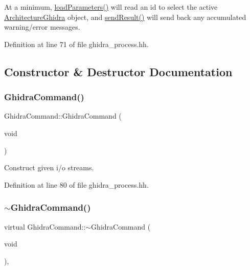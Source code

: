 At a minimum, \mbox{\hyperlink{class_ghidra_command_a3e92d63544a9e5a36f27f6c3b177b28a}{load\+Parameters()}} will read an id to select the active \mbox{\hyperlink{class_architecture_ghidra}{Architecture\+Ghidra}} object, and \mbox{\hyperlink{class_ghidra_command_a964ade9b1f768c55434d412834ba2eca}{send\+Result()}} will send back any accumulated warning/error messages. 

Definition at line 71 of file ghidra\+\_\+process.\+hh.



\subsection{Constructor \& Destructor Documentation}
\mbox{\label{class_ghidra_command_a41feaf5cd32bff29c0cac4eb30887ddc}} 
\subsubsection{\texorpdfstring{GhidraCommand()}{GhidraCommand()}}
{\footnotesize\ttfamily Ghidra\+Command\+::\+Ghidra\+Command (\begin{DoxyParamCaption}\item[{void}]{ }\end{DoxyParamCaption})\hspace{0.3cm}{\ttfamily [inline]}}



Construct given i/o streams. 



Definition at line 80 of file ghidra\+\_\+process.\+hh.

\mbox{\label{class_ghidra_command_a7143317bf9787b98a77fd5b45316333c}} 
\subsubsection{\texorpdfstring{$\sim$GhidraCommand()}{~GhidraCommand()}}
{\footnotesize\ttfamily virtual Ghidra\+Command\+::$\sim$\+Ghidra\+Command (\begin{DoxyParamCaption}\item[{void}]{ }\end{DoxyParamCaption})\hspace{0.3cm}{\ttfamily [inline]}, {\ttfamily [virtual]}}



